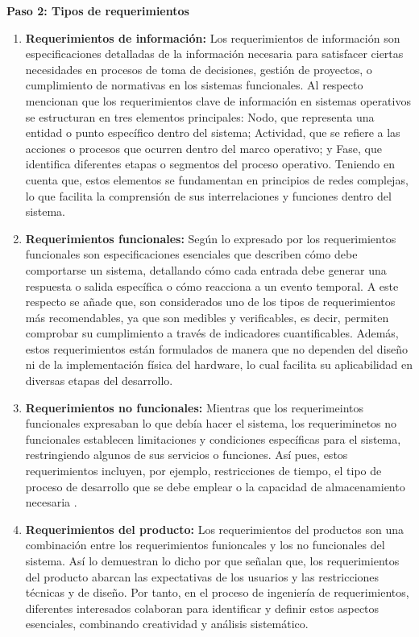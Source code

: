 \textbf{Paso 2: Tipos de requerimientos}
\begin{enumerate}
    \item \textbf{Requerimientos de información:} Los requerimientos de información son especificaciones detalladas de la información necesaria para satisfacer ciertas necesidades en procesos de toma de decisiones, gestión de proyectos, o cumplimiento de normativas en los sistemas funcionales. Al respecto \cite{yinghuietal2014} mencionan que los requerimientos clave de información en sistemas operativos se estructuran en tres elementos principales: Nodo, que representa una entidad o punto específico dentro del sistema; Actividad, que se refiere a las acciones o procesos que ocurren dentro del marco operativo; y Fase, que identifica diferentes etapas o segmentos del proceso operativo. Teniendo en cuenta que, estos elementos se fundamentan en principios de redes complejas, lo que facilita la comprensión de sus interrelaciones y funciones dentro del sistema.
    \item \textbf{Requerimientos funcionales:} Según lo expresado por \cite{fultonyvandermolen2017} los requerimientos funcionales son especificaciones esenciales que describen cómo debe comportarse un sistema, detallando cómo cada entrada debe generar una respuesta o salida específica o cómo reacciona a un evento temporal. A este respecto se añade que, son considerados uno de los tipos de requerimientos más recomendables, ya que son medibles y verificables, es decir, permiten comprobar su cumplimiento a través de indicadores cuantificables. Además, estos requerimientos están formulados de manera que no dependen del diseño ni de la implementación física del hardware, lo cual facilita su aplicabilidad en diversas etapas del desarrollo.
    \item \textbf{Requerimientos no funcionales:} Mientras que los requerimeintos funcionales expresaban lo que debía hacer el sistema, los requeriminetos no funcionales establecen limitaciones y condiciones específicas para el sistema, restringiendo algunos de sus servicios o funciones. Así pues, estos requerimientos incluyen, por ejemplo, restricciones de tiempo, el tipo de proceso de desarrollo que se debe emplear o la capacidad de almacenamiento necesaria \parencite{prietoychacon2017}.
    \item \textbf{Requerimientos del producto:} Los requerimientos del productos son una combinación entre los requerimientos funioncales y los no funcionales del sistema. Así lo demuestran lo dicho por \cite{maiden2001where} que señalan que, los requerimientos del producto abarcan las expectativas de los usuarios y las restricciones técnicas y de diseño. Por tanto, en el proceso de ingeniería de requerimientos, diferentes interesados colaboran para identificar y definir estos aspectos esenciales, combinando creatividad y análisis sistemático.

\end{enumerate}
